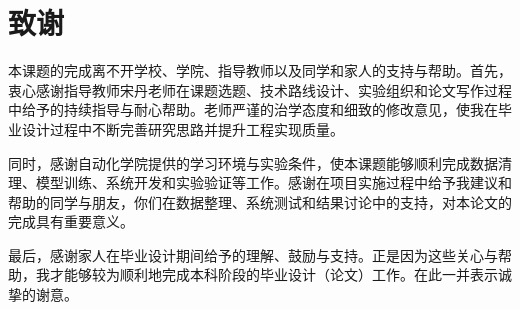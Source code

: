 \chapter*{致谢}

本课题的完成离不开学校、学院、指导教师以及同学和家人的支持与帮助。首先，衷心感谢指导教师宋丹老师在课题选题、技术路线设计、实验组织和论文写作过程中给予的持续指导与耐心帮助。老师严谨的治学态度和细致的修改意见，使我在毕业设计过程中不断完善研究思路并提升工程实现质量。

同时，感谢自动化学院提供的学习环境与实验条件，使本课题能够顺利完成数据清理、模型训练、系统开发和实验验证等工作。感谢在项目实施过程中给予我建议和帮助的同学与朋友，你们在数据整理、系统测试和结果讨论中的支持，对本论文的完成具有重要意义。

最后，感谢家人在毕业设计期间给予的理解、鼓励与支持。正是因为这些关心与帮助，我才能够较为顺利地完成本科阶段的毕业设计（论文）工作。在此一并表示诚挚的谢意。
